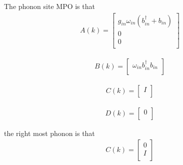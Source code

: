 \documentclass[a4paper,11pt]{ctexart}
\begin{document}
The phonon site MPO is that
\begin{gather}
A(k) = 
\begin{bmatrix}
    g_{in} \omega_{in}(b^\dagger_{in}+b_{in})  \\
    0 \\
    0 \\
\end{bmatrix}
\end{gather}

\begin{gather}
B(k) = 
\begin{bmatrix}
    \omega_{in} b^\dagger_{in}b_{in}   \\
\end{bmatrix}
\end{gather}

\begin{gather}
C(k) = 
\begin{bmatrix}
    I \\ 
\end{bmatrix}
\end{gather}

\begin{gather}
D(k) = 
\begin{bmatrix}
     0 \\ 
\end{bmatrix}
\end{gather}

the right most phonon is that
\begin{gather}
C(k) = 
\begin{bmatrix}
    0 \\
    I \\ 
\end{bmatrix}
\end{gather}
\end{document}
